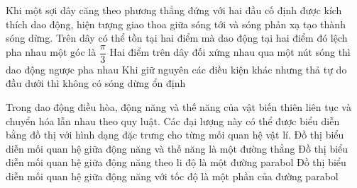 \begin{ex}
	Khi một sợi dây căng theo phương thẳng đứng với hai đầu cố định được kích thích dao động, hiện tượng giao thoa giữa sóng tới và sóng phản xạ tạo thành sóng dừng.
	{Trên dây có thể tồn tại hai điểm mà dao động tại hai điểm đó lệch pha nhau một góc là $\dfrac{\pi}{3}$}
	{Hai điểm trên dây đối xứng nhau qua một nút sóng thì dao động ngược pha nhau}
	{\True Khi giữ nguyên các điều kiện khác nhưng thả tự do đầu dưới thì không có sóng dừng ổn định} 
\end{ex}
\begin{ex}
 Trong dao động điều hòa, động năng và thế năng của vật biến thiên liên tục và chuyển hóa lẫn nhau theo quy luật. Các đại lượng này có thể được biểu diễn bằng đồ thị với hình dạng đặc trưng cho từng mối quan hệ vật lí.
	{Đồ thị biểu diễn mối quan hệ giữa động năng và thế năng là một đường thẳng}
	{\True Đồ thị biểu diễn mối quan hệ giữa động năng theo li độ là một đường parabol}
	{\True Đồ thị biểu diễn mối quan hệ giữa động năng với tốc độ là một phần của đường parabol}
\end{ex}
